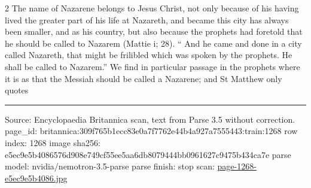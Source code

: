 \documentclass[10pt]{article}
\begin{document}
\begin{multicols}{2}
The name of Nazarene belongs to Jesus Christ, not only because of his having lived the greater part of his life at Nazareth, and became this city has always been smaller, and as his country, but also because the prophets had foretold that he should be called to Nazarem (Mattie i; 28). “ And he came and done in a city called Nazareth, that might be frilibled which was spoken by the prophets. He shall be called to Nazarem.” We find in particular passage in the prophets where it is as that the Messiah should be called a Nazarene; and St Matthew only quotes

\end{multicols}
\vfill\par\noindent\rule{\linewidth}{0.4pt}\par
{\scriptsize\color{gray}\noindent Source: Encyclopaedia Britannica scan, text from Parse 3.5 without correction. page\_id: britannica:309f765b1ecc83e0a7f7762e44b4a927a7555443:train:1268 \quad row index: 1268 \quad image sha256: e5ec9e5b4086576d908e749cf55ee5aa6db8079444bb0961627c9475b434ca7e \quad parse model: nvidia/nemotron-3.5-parse \quad parse finish: stop \quad scan: \href{../scans/page-1268-e5ec9e5b4086.jpg}{page-1268-e5ec9e5b4086.jpg}\par}
\end{document}
